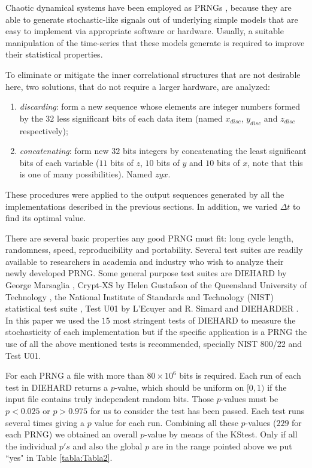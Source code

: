 Chaotic dynamical systems have been employed as PRNGs \cite{Kocarev2003,Larrondo2006,DeMicco2009}, because they are able to generate stochastic-like signals out of underlying simple models that are easy to implement via appropriate software or hardware.
Usually, a suitable manipulation of the time-series that these models generate is required to improve their statistical properties.

To eliminate or mitigate the inner correlational structures that are not desirable here, two solutions, that do not require a larger hardware, are analyzed:
\begin{enumerate}
\item \textit{discarding}: form a new sequence whose elements are integer numbers formed by the $32$ less significant bits of each data item (named $x_{disc}$, $y_{disc}$ and $z_{disc}$ respectively);
\item \textit{concatenating}: form new $32$ bits integers by concatenating the least significant bits of each variable ($11$ bits of $z$, $10$ bits of $y$ and $10$ bits of $x$, note that this is one of many possibilities).
Named $zyx$.
\end{enumerate}

These procedures were applied to the output sequences generated by all the implementations described in the previous sections.
In addition, we varied $\Delta t$ to find its optimal value.

There are several basic properties any good PRNG must fit: long cycle length, randomness, speed, reproducibility and portability.
Several test suites \cite{Soto} are readily available to researchers in academia and industry who wish to analyze their newly developed PRNG.
Some general purpose test suites are DIEHARD by George Marsaglia \cite{Marsaglia1995}, Crypt-XS by Helen Gustafson of the Queensland University of Technology \cite{Gustafson1994}, the National Institute of Standards and Technology (NIST) statistical test suite \cite{Rukhin2000}, Test U01 by L'Ecuyer and R. Simard \cite{Lecuyer2007}  and DIEHARDER \cite{Brown2012}.
In this paper we used the $15$ most stringent tests of DIEHARD \cite{Marsaglia1995} to measure the stochasticity of each implementation but if the specific application is a PRNG the use of all the above mentioned tests is recommended, specially NIST 800/22 and Test U01.

For each PRNG a file with more than $80 \times 10^6$ bits is required.
Each run of each test in DIEHARD returns a $p$-value, which should be uniform on $[0,1)$ if the input file contains truly independent random bits.
Those $p$-values must be $p < 0.025$ or $p> 0.975$ for us to consider the test has been passed.
Each test runs several times giving a $p$ value for each run.
Combining all these $p$-values ($229$ for each PRNG) we obtained an overall $p$-value  by means of the KStest.
Only if all the individual $p's$ and also the global $p$ are in the range pointed above we put ``yes" in Table \ref{tabla:Tabla2}.

